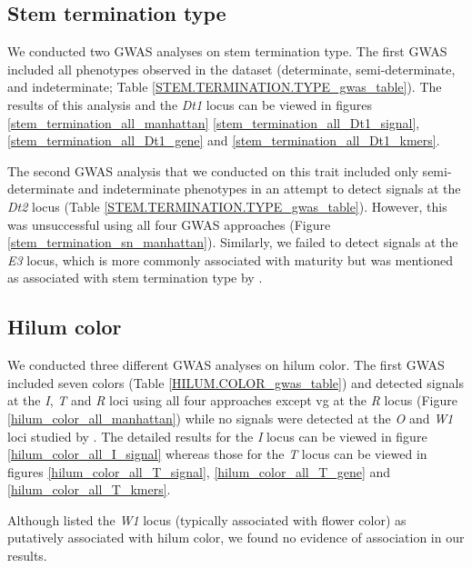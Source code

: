 \documentclass[12pt]{article}
\begin{document}
\subsection{Stem termination type}
\label{sv-gwas-stem-termination}

We conducted two GWAS analyses on stem termination type. The first GWAS
included all phenotypes observed in the dataset (determinate, semi-determinate,
and indeterminate; Table \ref{STEM.TERMINATION.TYPE_gwas_table}). The results
of this analysis and the \textit{Dt1} locus can be viewed in figures \ref{stem_termination_all_manhattan}
\ref{stem_termination_all_Dt1_signal}, \ref{stem_termination_all_Dt1_gene} and
\ref{stem_termination_all_Dt1_kmers}.

The second GWAS analysis that we conducted on this trait included only
semi-determinate and indeterminate phenotypes in an attempt to detect signals
at the \emph{Dt2} locus (Table \ref{STEM.TERMINATION.TYPE_gwas_table}).
However, this was unsuccessful using all four GWAS
approaches (Figure \ref{stem_termination_sn_manhattan}). Similarly, we failed to
detect signals at the \textit{E3} locus, which is more commonly associated
with maturity but was mentioned as associated with stem termination type by
\cite{bandillo2017}.

\subsection{Hilum color}
\label{sv-gwas-hilum-color}

We conducted three different GWAS analyses on hilum color. The first GWAS
included seven colors (Table \ref{HILUM.COLOR_gwas_table}) and detected signals
at the \emph{I}, \emph{T} and \emph{R} loci using all four approaches except vg
at the \emph{R} locus (Figure \ref{hilum_color_all_manhattan}) while no signals
were detected at the \emph{O} and \emph{W1} loci studied by
\cite{bandillo2017}. The detailed results for the \textit{I} locus can be viewed
in figure \ref{hilum_color_all_I_signal} whereas those for the \textit{T} locus
can be viewed in figures \ref{hilum_color_all_T_signal}, \ref{hilum_color_all_T_gene}
and \ref{hilum_color_all_T_kmers}.

Although \cite{bandillo2017} listed the \textit{W1} locus (typically associated
with flower color) as putatively associated with hilum color, we found no
evidence of association in our results.
\end{document}
